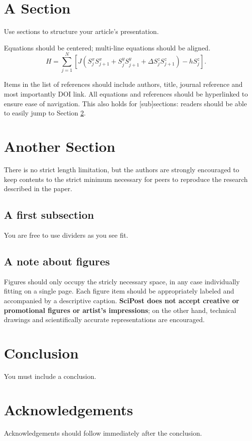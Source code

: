 \documentclass[submission]{SciPost}
\begin{document}
\section{A Section}
Use sections to structure your article's presentation. 

Equations should be centered; multi-line equations should be aligned.
\begin{equation}
H = \sum_{j=1}^N \left[J (S^x_j S^x_{j+1} + S^y_j S^y_{j+1} + \Delta S^z_j S^z_{j+1}) - h S^z_j \right].
\end{equation}

Items in the list of references\cite{1931_Bethe_ZP_71} should include authors, title, journal reference and most importantly DOI link. All equations and references should be hyperlinked to ensure ease of navigation. This also holds for [sub]sections: readers should be able to easily jump to Section \ref{sec:another}.

\section{Another Section}
\label{sec:another}
There is no strict length limitation, but the authors are strongly encouraged to keep contents to the strict minimum necessary for peers to reproduce the research described in the paper.

\subsection{A first subsection}
You are free to use dividers as you see fit.
\subsection{A note about figures}
Figures should only occupy the stricly necessary space, in any case individually fitting on a single page. Each figure item should be appropriately labeled and accompanied by a descriptive caption. {\bf SciPost does not accept creative or promotional figures or artist's impressions}; on the other hand, technical drawings and scientifically accurate representations are encouraged.


\section{Conclusion}
You must include a conclusion.

\section*{Acknowledgements}
Acknowledgements should follow immediately after the conclusion. 
\end{document}
